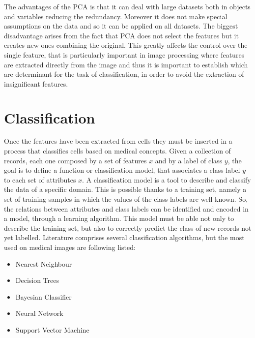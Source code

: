 \documentclass[final,a4paper,12pt,english]{UnicaPhdThesis3}
\begin{document}
The advantages of the PCA is that it can deal with large datasets both in objects and variables reducing the redundancy. Moreover it does not make special assumptions on the data and so it can be applied on all datasets. The biggest disadvantage arises from the fact that PCA does not select the features but it creates new ones combining the original. This greatly affects the control over the single feature, that is particularly important in image processing where features are extracted directly from the image and thus it is important to establish which are determinant for the task of classification, in order to avoid the extraction of insignificant features.  

\chapter{Classification}
Once the features have been extracted from cells they must be inserted in a process that classifies cells based on medical concepts. Given a collection of records, each one composed by a set of features $x$ and by a label of class $y$, the goal is to define a function or classification model, that associates a class label $y$ to each set of attributes $x$. A classification model is a tool to describe and classify the data of a specific domain. This is possible thanks to a training set, namely a set of training samples in which the values ​​of the class labels are well known. So, the relations between attributes and class labels can be identified and encoded in a model, through a learning algorithm. This model must be able not only to describe the training set, but also to correctly predict the class of new records not yet labelled. Literature comprises several classification algorithms, but the most used on medical images are following listed:
\begin{itemize}
\item Nearest Neighbour
\item Decision Trees
\item Bayesian Classifier	
\item Neural Network
\item Support Vector Machine
\end{itemize}
\end{document}

